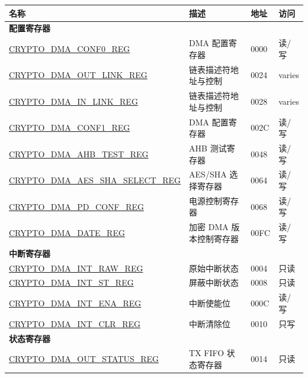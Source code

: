 \begin{longtable}{ | p{6cm} | p{7.2cm} | p{1.3cm} | p{1cm} | }
\hline\rowcolor{lightgray}
名称 & 描述 &  地址 & 访问 \\ \hline
\endhead
\multicolumn{4}{|l|}{\textbf{配置寄存器}} \\ \hline
\hyperref[regdesc:CRYPTODMACONF0REG]{CRYPTO\_DMA\_CONF0\_REG} & DMA 配置寄存器 & \hexprefix{}0000 & 读/写 \\ \hline
\hyperref[regdesc:CRYPTODMAOUTLINKREG]{CRYPTO\_DMA\_OUT\_LINK\_REG} & 链表描述符地址与控制 & \hexprefix{}0024 & varies \\ \hline
\hyperref[regdesc:CRYPTODMAINLINKREG]{CRYPTO\_DMA\_IN\_LINK\_REG} & 链表描述符地址与控制 & \hexprefix{}0028 & varies \\ \hline
\hyperref[regdesc:CRYPTODMACONF1REG]{CRYPTO\_DMA\_CONF1\_REG} & DMA 配置寄存器 & \hexprefix{}002C & 读/写 \\ \hline
\hyperref[regdesc:CRYPTODMAAHBTESTREG]{CRYPTO\_DMA\_AHB\_TEST\_REG} & AHB 测试寄存器 & \hexprefix{}0048 & 读/写 \\ \hline
\hyperref[regdesc:CRYPTODMAAESSHASELECTREG]{CRYPTO\_DMA\_AES\_SHA\_SELECT\newline\_REG} & AES/SHA 选择寄存器 & \hexprefix{}0064 & 读/写 \\ \hline
\hyperref[regdesc:CRYPTODMAPDCONFREG]{CRYPTO\_DMA\_PD\_CONF\_REG} & 电源控制寄存器 & \hexprefix{}0068 & 读/写 \\ \hline
\hyperref[regdesc:CRYPTODMADATEREG]{CRYPTO\_DMA\_DATE\_REG} & 加密 DMA 版本控制寄存器 & \hexprefix{}00FC & 读/写 \\ \hline
\multicolumn{4}{|l|}{\textbf{中断寄存器}} \\ \hline
\hyperref[regdesc:CRYPTODMAINTRAWREG]{CRYPTO\_DMA\_INT\_RAW\_REG} & 原始中断状态 & \hexprefix{}0004 & 只读 \\ \hline
\hyperref[regdesc:CRYPTODMAINTSTREG]{CRYPTO\_DMA\_INT\_ST\_REG} & 屏蔽中断状态 & \hexprefix{}0008 & 只读 \\ \hline
\hyperref[regdesc:CRYPTODMAINTENAREG]{CRYPTO\_DMA\_INT\_ENA\_REG} & 中断使能位 & \hexprefix{}000C & 读/写 \\ \hline
\hyperref[regdesc:CRYPTODMAINTCLRREG]{CRYPTO\_DMA\_INT\_CLR\_REG} & 中断清除位 & \hexprefix{}0010 & 只写 \\ \hline
\multicolumn{4}{|l|}{\textbf{状态寄存器}} \\ \hline
\hyperref[regdesc:CRYPTODMAOUTSTATUSREG]{CRYPTO\_DMA\_OUT\_STATUS\_REG} & TX FIFO 状态寄存器 & \hexprefix{}0014 & 只读 \\ \hline

\end{longtable}
